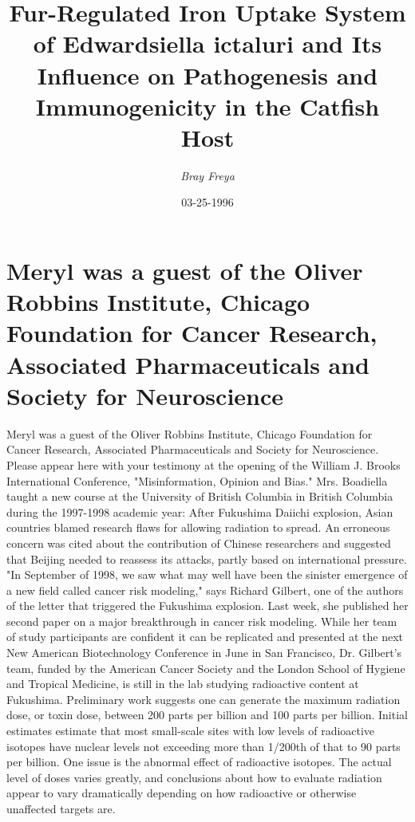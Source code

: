 \documentclass{article}%
\title{Fur{-}Regulated Iron Uptake System of Edwardsiella ictaluri and Its Influence on Pathogenesis and Immunogenicity in the Catfish Host}%
\author{\textit{Bray Freya}}%
\date{03-25-1996}%
\begin{document}
%
\normalsize%
\maketitle%
\section{Meryl was a guest of the Oliver Robbins Institute, Chicago Foundation for Cancer Research, Associated Pharmaceuticals and Society for Neuroscience}%
\label{sec:MerylwasaguestoftheOliverRobbinsInstitute,ChicagoFoundationforCancerResearch,AssociatedPharmaceuticalsandSocietyforNeuroscience}%
Meryl was a guest of the Oliver Robbins Institute, Chicago Foundation for Cancer Research, Associated Pharmaceuticals and Society for Neuroscience. Please appear here with your testimony at the opening of the William J. Brooks International Conference, "Misinformation, Opinion and Bias."\newline%
Mrs. Boadiella taught a new course at the University of British Columbia in British Columbia during the 1997{-}1998 academic year: After Fukushima Daiichi explosion, Asian countries blamed research flaws for allowing radiation to spread. An erroneous concern was cited about the contribution of Chinese researchers and suggested that Beijing needed to reassess its attacks, partly based on international pressure. "In September of 1998, we saw what may well have been the sinister emergence of a new field called cancer risk modeling," says Richard Gilbert, one of the authors of the letter that triggered the Fukushima explosion.\newline%
Last week, she published her second paper on a major breakthrough in cancer risk modeling. While her team of study participants are confident it can be replicated and presented at the next New American Biotechnology Conference in June in San Francisco, Dr. Gilbert's team, funded by the American Cancer Society and the London School of Hygiene and Tropical Medicine, is still in the lab studying radioactive content at Fukushima.\newline%
Preliminary work suggests one can generate the maximum radiation dose, or toxin dose, between 200 parts per billion and 100 parts per billion. Initial estimates estimate that most small{-}scale sites with low levels of radioactive isotopes have nuclear levels not exceeding more than 1/200th of that to 90 parts per billion.\newline%
One issue is the abnormal effect of radioactive isotopes. The actual level of doses varies greatly, and conclusions about how to evaluate radiation appear to vary dramatically depending on how radioactive or otherwise unaffected targets are.\newline%
\end{document}
